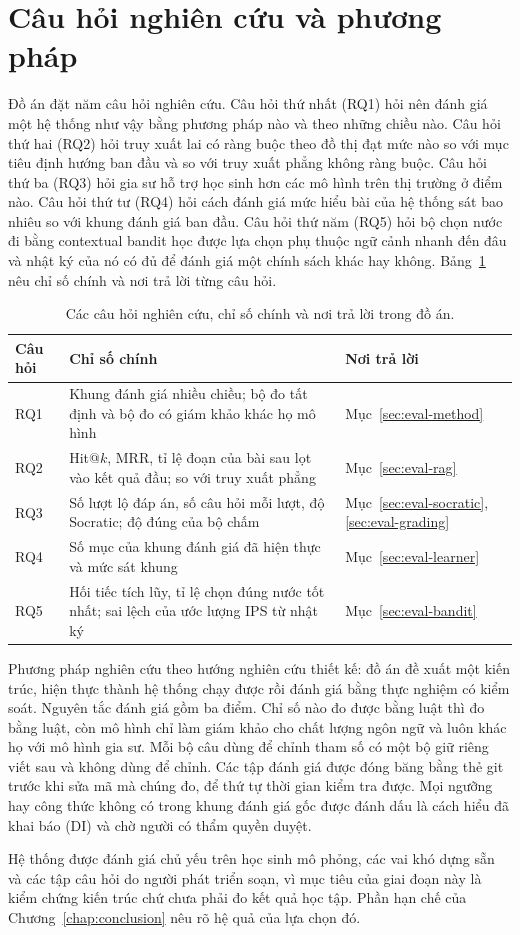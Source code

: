 \section{Câu hỏi nghiên cứu và phương pháp}

Đồ án đặt năm câu hỏi nghiên cứu. Câu hỏi thứ nhất (RQ1) hỏi nên đánh giá một hệ thống như vậy bằng phương pháp nào và theo những chiều nào. Câu hỏi thứ hai (RQ2) hỏi truy xuất lai có ràng buộc theo đồ thị đạt mức nào so với mục tiêu định hướng ban đầu và so với truy xuất phẳng không ràng buộc. Câu hỏi thứ ba (RQ3) hỏi gia sư hỗ trợ học sinh hơn các mô hình trên thị trường ở điểm nào. Câu hỏi thứ tư (RQ4) hỏi cách đánh giá mức hiểu bài của hệ thống sát bao nhiêu so với khung đánh giá ban đầu. Câu hỏi thứ năm (RQ5) hỏi bộ chọn nước đi bằng contextual bandit học được lựa chọn phụ thuộc ngữ cảnh nhanh đến đâu và nhật ký của nó có đủ để đánh giá một chính sách khác hay không. Bảng~\ref{tab:rq} nêu chỉ số chính và nơi trả lời từng câu hỏi.

\begin{table}[ht]
\centering
\caption{Các câu hỏi nghiên cứu, chỉ số chính và nơi trả lời trong đồ án.}
\label{tab:rq}
\small
\begin{tabularx}{\linewidth}{@{}p{1.7cm}XX@{}}
\toprule
Câu hỏi & Chỉ số chính & Nơi trả lời \\
\midrule
RQ1 & Khung đánh giá nhiều chiều; bộ đo tất định và bộ đo có giám khảo khác họ mô hình & Mục~\ref{sec:eval-method} \\
RQ2 & Hit@$k$, MRR, tỉ lệ đoạn của bài sau lọt vào kết quả đầu; so với truy xuất phẳng & Mục~\ref{sec:eval-rag} \\
RQ3 & Số lượt lộ đáp án, số câu hỏi mỗi lượt, độ Socratic; độ đúng của bộ chấm & Mục~\ref{sec:eval-socratic}, \ref{sec:eval-grading} \\
RQ4 & Số mục của khung đánh giá đã hiện thực và mức sát khung & Mục~\ref{sec:eval-learner} \\
RQ5 & Hối tiếc tích lũy, tỉ lệ chọn đúng nước tốt nhất; sai lệch của ước lượng IPS từ nhật ký & Mục~\ref{sec:eval-bandit} \\
\bottomrule
\end{tabularx}
\end{table}

Phương pháp nghiên cứu theo hướng nghiên cứu thiết kế: đồ án đề xuất một kiến trúc, hiện thực thành hệ thống chạy được rồi đánh giá bằng thực nghiệm có kiểm soát. Nguyên tắc đánh giá gồm ba điểm. Chỉ số nào đo được bằng luật thì đo bằng luật, còn mô hình chỉ làm giám khảo cho chất lượng ngôn ngữ và luôn khác họ với mô hình gia sư. Mỗi bộ câu dùng để chỉnh tham số có một bộ giữ riêng viết sau và không dùng để chỉnh. Các tập đánh giá được đóng băng bằng thẻ git trước khi sửa mã mà chúng đo, để thứ tự thời gian kiểm tra được. Mọi ngưỡng hay công thức không có trong khung đánh giá gốc được đánh dấu là cách hiểu đã khai báo (DI) và chờ người có thẩm quyền duyệt.

Hệ thống được đánh giá chủ yếu trên học sinh mô phỏng, các vai khó dựng sẵn và các tập câu hỏi do người phát triển soạn, vì mục tiêu của giai đoạn này là kiểm chứng kiến trúc chứ chưa phải đo kết quả học tập. Phần hạn chế của Chương~\ref{chap:conclusion} nêu rõ hệ quả của lựa chọn đó.
